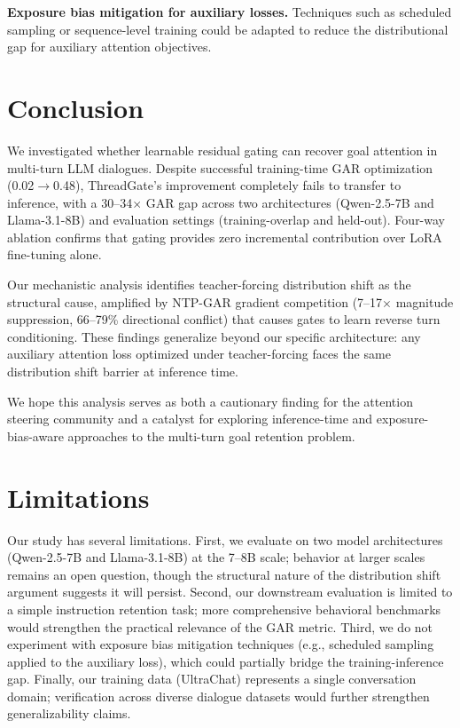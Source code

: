 \documentclass[11pt,a4paper]{article}
\begin{document}
\textbf{Exposure bias mitigation for auxiliary losses.}
Techniques such as scheduled sampling \citep{bengio2015scheduled} or sequence-level training \citep{ranzato2016sequence} could be adapted to reduce the distributional gap for auxiliary attention objectives.

\section{Conclusion}

We investigated whether learnable residual gating can recover goal attention in multi-turn LLM dialogues.
Despite successful training-time GAR optimization (0.02$\to$0.48), ThreadGate's improvement completely fails to transfer to inference, with a 30--34$\times$ GAR gap across two architectures (Qwen-2.5-7B and Llama-3.1-8B) and evaluation settings (training-overlap and held-out).
Four-way ablation confirms that gating provides zero incremental contribution over LoRA fine-tuning alone.

Our mechanistic analysis identifies teacher-forcing distribution shift as the structural cause, amplified by NTP-GAR gradient competition (7--17$\times$ magnitude suppression, 66--79\% directional conflict) that causes gates to learn reverse turn conditioning.
These findings generalize beyond our specific architecture: any auxiliary attention loss optimized under teacher-forcing faces the same distribution shift barrier at inference time.

We hope this analysis serves as both a cautionary finding for the attention steering community and a catalyst for exploring inference-time and exposure-bias-aware approaches to the multi-turn goal retention problem.

\section*{Limitations}

Our study has several limitations.
First, we evaluate on two model architectures (Qwen-2.5-7B and Llama-3.1-8B) at the 7--8B scale; behavior at larger scales remains an open question, though the structural nature of the distribution shift argument suggests it will persist.
Second, our downstream evaluation is limited to a simple instruction retention task; more comprehensive behavioral benchmarks would strengthen the practical relevance of the GAR metric.
Third, we do not experiment with exposure bias mitigation techniques (e.g., scheduled sampling applied to the auxiliary loss), which could partially bridge the training-inference gap.
Finally, our training data (UltraChat) represents a single conversation domain; verification across diverse dialogue datasets would further strengthen generalizability claims.
\end{document}
